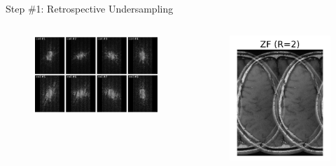\documentclass[aspectratio=169]{beamer}
\begin{document}
	\begin{frame}{Step \#1: Retrospective Undersampling}
		\begin{columns}
			\begin{figure}
				\centering
				\includegraphics[width=\columnwidth]{figures/espirit_undersampled_kspace.png}
			\end{figure}
			
			\begin{figure}
				\centering
				\includegraphics[width=\columnwidth]{figures/espirit_zf.png}
			\end{figure}
		\end{columns}
		

\end{frame}
\end{document}
